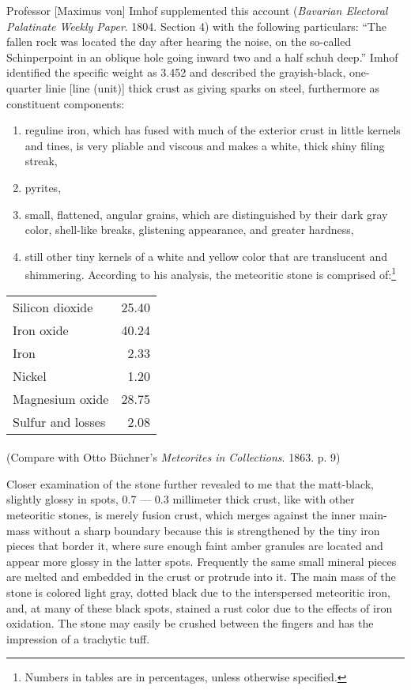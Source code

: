 \documentclass[a4paper, 12pt, oneside]{article}
\begin{document}
Professor [Maximus von] Imhof supplemented this account (\emph{Bavarian Electoral Palatinate Weekly Paper}. 1804. Section 4) with the following particulars: ``The fallen rock was located the day after hearing the noise, on the so-called Schinperpoint in an oblique hole going inward two and a half schuh deep.'' Imhof identified the specific weight as 3.452 and described the grayish-black, one-quarter linie [line (unit)] thick crust as giving sparks on steel, furthermore as constituent components:
\begin{enumerate}
    \item reguline iron, which has fused with much of the exterior crust in little kernels and tines, is very pliable and viscous and makes a white, thick shiny filing streak,
    \item pyrites,
    \item small, flattened, angular grains, which are distinguished by their dark gray color, shell-like breaks, glistening appearance, and greater hardness,
    \item still other tiny kernels of a white and yellow color that are translucent and shimmering. According to his analysis, the meteoritic stone is comprised of:\footnote{Numbers in tables are in percentages, unless otherwise specified.}
\end{enumerate}
\begin{center}
    \begin{tabular}{l r} 
    Silicon dioxide & 25.40\\
    Iron oxide & 40.24\\
    Iron & 2.33\\
    Nickel & 1.20\\
    Magnesium oxide & 28.75\\
    Sulfur and losses & 2.08\\
    \end{tabular}
\end{center}
\paragraph{}
(Compare with Otto Büchner's \emph{Meteorites in Collections}. 1863. p. 9)

Closer examination of the stone further revealed to me that the matt-black, slightly glossy in spots, 0.7 --- 0.3 millimeter thick crust, like with other meteoritic stones, is merely fusion crust, which merges against the inner main-mass without a sharp boundary because this is strengthened by the tiny iron pieces that border it, where sure enough faint amber granules are located and appear more glossy in the latter spots. Frequently the same small mineral pieces are melted and embedded in the crust or protrude into it. The main mass of the stone is colored light gray, dotted black due to the interspersed meteoritic iron, and, at many of these black spots, stained a rust color due to the effects of iron oxidation. The stone may easily be crushed between the fingers and has the impression of a trachytic tuff.
\end{document}

